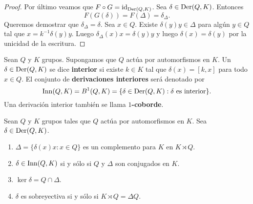 \begin{proof}
	Por último veamos que $F\circ G=\operatorname{id}_{\operatorname{Der}(Q,K)}$. Sea $\delta\in\operatorname{Der}(Q,K)$.
	Entonces 
	\[
	F(G(\delta))=F(\Delta)=\delta_{\Delta}.
	\]
	Queremos demostrar que $\delta_\Delta=\delta$.  Sea $x\in Q$. Existe
	$\delta(y)y\in\Delta$ para algún $y\in Q$ tal que $x=k^{-1}\delta(y)y$.
	Luego $\delta_{\Delta}(x)x=\delta(y)y$ y luego $\delta(x)=\delta(y)$ por la
	unicidad de la escritura.
\end{proof}

\begin{definition}
	Sean $Q$ y $K$ grupos. Supongamos que $Q$ actúa por automorfismos en $K$.
	Un $\delta\in\operatorname{Der}(Q,K)$ se dice \textbf{interior} si existe $k\in K$ tal
	que $\delta(x)=[k,x]$ para todo $x\in Q$. El conjunto de
	\textbf{derivaciones interiores} será denotado por
	\[
		\mathrm{Inn}(Q,K)=B^1(Q,K)=\{\delta\in\operatorname{Der}(Q,K):\text{$\delta$ es interior}\}.
	\]
	Una derivación interior también se llama \textbf{$1$-coborde}.
\end{definition}

\begin{theorem}[Sysak]
	\label{theorem:Sysak}
	Sean $Q$ y $K$ grupos tales que $Q$ actúa por automorfismos en $K$. Sea
	$\delta\in\operatorname{Der}(Q,K)$.
	\begin{enumerate}
		\item $\Delta=\{\delta(x)x:x\in Q\}$ es un complemento para $K$ en $K\rtimes Q$.
		\item $\delta\in\mathrm{Inn}(Q,K)$ si y sólo si $Q$ y $\Delta$ son conjugados en
			$K$.
		\item $\ker\delta=Q\cap\Delta$.
		\item $\delta$ es sobreyectiva si y sólo si $K\rtimes Q=\Delta Q$.
	\end{enumerate}
\end{theorem}

